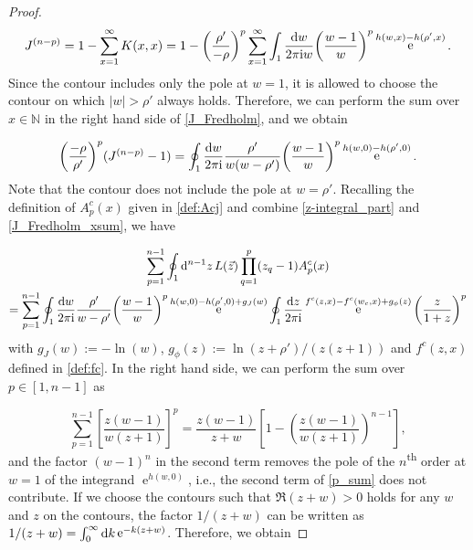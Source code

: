 \documentclass[cmp]{svjour}
\numberwithin{theorem}{section}
\numberwithin{equation}{section}
\DeclareMathOperator{\e}{e}
\def\dd{{\rm d}}
\def\ii{{\rm i}}
\begin{document}
\begin{proof}
\begin{equation}
\label{J_Fredholm}
J^{(n-p)}=
1- \sum_{x=1}^{\infty} K(x,x)
=1-\left(\frac{\rho'}{-\rho} \right)^{p} \sum_{x=1}^{\infty}
\int_1\frac{\dd w}{2 \pi \ii w}{\left( \frac{w-1}{w} \right)}^p   \e^{h(w,x)-h(\rho' , x)}.
\end{equation}
Since the contour includes only the pole at $w = 1$, it is allowed to choose the contour on which $|w| > \rho'$ always holds. Therefore, we can perform the sum over $x \in \mathbb{N}$ in the right hand side of \eqref{J_Fredholm}, and we obtain

\begin{equation}
\label{J_Fredholm_xsum}
{\left( \frac{-\rho}{\rho'} \right)}^p (J^{(n-p)} - 1) = \oint_{1} \frac{\dd w}{2 \pi \ii} \frac{\rho'}{w(w - \rho')} {\left( \frac{w - 1}{w} \right)}^p \e^{h(w , 0) - h(\rho',0)}.
\end{equation}
Note that the contour does not include the pole at $w = \rho'$.
Recalling the definition of $A^c_p(x)$ given in \eqref{def:Acj} and combine \eqref{z-integral_part} and \eqref{J_Fredholm_xsum}, we have 

\begin{multline*}
\label{p_sum_part_original}
\sum_{p=1}^{n-1} \oint_1 \dd^{n-1} z\,  L(\vec{z}) \prod_{q=1}^{p}(z_q-1) A^c_p(x)
\\ = \sum_{p=1}^{n-1}  \oint_{1} \frac{\dd w}{2 \pi \ii} \frac{\rho'}{w - \rho'} {\left( \frac{w-1}{w} \right)}^p  \e^{h(w,0)- h(\rho', 0) + g_J(w)} \oint_1 \frac{\dd z}{2 \pi \ii} \e^{ f^c(z,x)- f^c(w_c,x) + g_{\phi}(z)} {\left( \frac{z}{1 + z} \right)}^p 
\end{multline*}
with $g_J(w) := - \ln(w)$, $g_\phi(z):=\ln{(z+\rho')/(z(z+1))}$ and $f^c(z,x)$ defined in \eqref{def:fc}. 
In the right hand side, we can perform the sum over $p \in [1,n-1]$ as


\begin{equation}
\label{p_sum}
\sum_{p=1}^{n-1}{ {\left[ \frac{z(w-1)}{w(z+1)} \right]}^p } = \frac{z(w-1)}{z+w} \left[ 1 - {\left(  \frac{z(w-1)}{w(z+1)} \right)}^{n-1} \right],
\end{equation}
and the factor ${(w - 1)}^n$ in the second term removes the pole of the $n$\textsuperscript{th} order at $w = 1$ of the integrand $\e^{h(w,0)}$, i.e., the second term of \eqref{p_sum} does not contribute.
If we choose the contours such that $\Re(z + w) >0$ holds for any $w$ and $z$ on the contours, the factor $1/(z + w)$ can be written as $1/(z + w) = \int_{0}^{ \infty } \dd k \e^{- k (z + w)}$. Therefore, we obtain


\end{proof}
\end{document}
